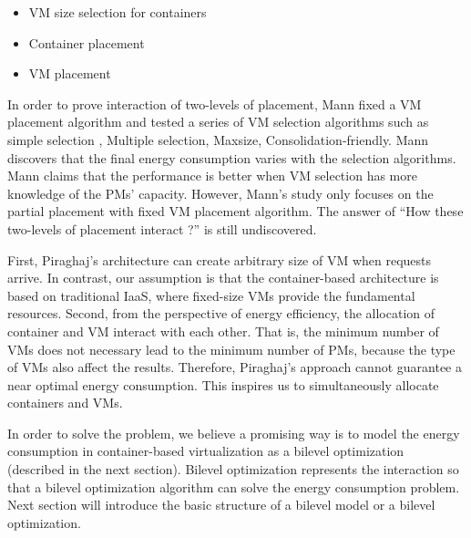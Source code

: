 \begin{itemize}
	\item VM size selection for containers
	\item Container placement
	\item VM placement
\end{itemize}

In order to prove interaction of two-levels of placement, Mann fixed a VM placement algorithm and tested a series of VM selection algorithms such as simple selection \cite{Ganesan:2012eb},  Multiple selection, Maxsize, Consolidation-friendly. Mann discovers that the final energy consumption varies with the selection algorithms. Mann claims that the performance is better when VM selection has more knowledge of the PMs' capacity. However, Mann's study only focuses on the partial placement with fixed VM placement algorithm. The answer of ``How these two-levels of placement interact ?'' is still undiscovered.


 First, Piraghaj's architecture can create arbitrary size of VM when requests arrive. In contrast, our assumption is that the container-based architecture is based on traditional IaaS, where fixed-size VMs provide the fundamental resources. Second, from the perspective of energy efficiency, the allocation of container and VM interact with each other. That is, the minimum number of VMs does not necessary lead to the minimum number of PMs, because the type of VMs also affect the results. Therefore, Piraghaj's approach cannot guarantee a near optimal energy consumption. This inspires us to simultaneously allocate containers and VMs. 


In order to solve the problem, we believe a promising way is to model the energy consumption in container-based virtualization as a bilevel optimization~\cite{Colson:2007bu} (described in the next section). Bilevel optimization represents the interaction so that a bilevel optimization algorithm can solve the energy consumption problem. Next section will introduce the basic structure of a bilevel model or a bilevel optimization.




